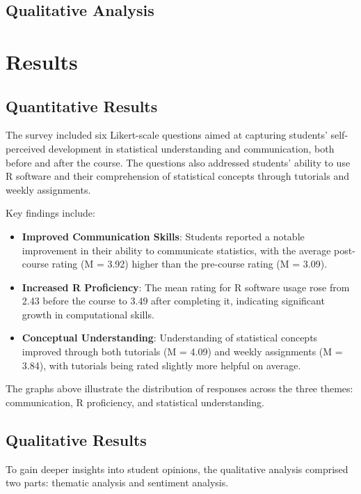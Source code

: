 \documentclass[
  letterpaper,
  DIV=11,
  numbers=noendperiod]{scrartcl}
\providecommand{\tightlist}{%
  \setlength{\itemsep}{0pt}\setlength{\parskip}{0pt}}\usepackage{longtable,booktabs,array}
\begin{document}
\subsection{Qualitative Analysis}\label{qualitative-analysis}

\section{Results}\label{results}

\subsection{Quantitative Results}\label{quantitative-results}

The survey included six Likert-scale questions aimed at capturing
students' self-perceived development in statistical understanding and
communication, both before and after the course. The questions also
addressed students' ability to use R software and their comprehension of
statistical concepts through tutorials and weekly assignments.

Key findings include:

\begin{itemize}
\tightlist
\item
  \textbf{Improved Communication Skills}: Students reported a notable
  improvement in their ability to communicate statistics, with the
  average post-course rating (M = 3.92) higher than the pre-course
  rating (M = 3.09).
\item
  \textbf{Increased R Proficiency}: The mean rating for R software usage
  rose from 2.43 before the course to 3.49 after completing it,
  indicating significant growth in computational skills.
\item
  \textbf{Conceptual Understanding}: Understanding of statistical
  concepts improved through both tutorials (M = 4.09) and weekly
  assignments (M = 3.84), with tutorials being rated slightly more
  helpful on average.
\end{itemize}

The graphs above illustrate the distribution of responses across the
three themes: communication, R proficiency, and statistical
understanding.

\subsection{Qualitative Results}\label{qualitative-results}

To gain deeper insights into student opinions, the qualitative analysis
comprised two parts: thematic analysis and sentiment analysis.
\end{document}
